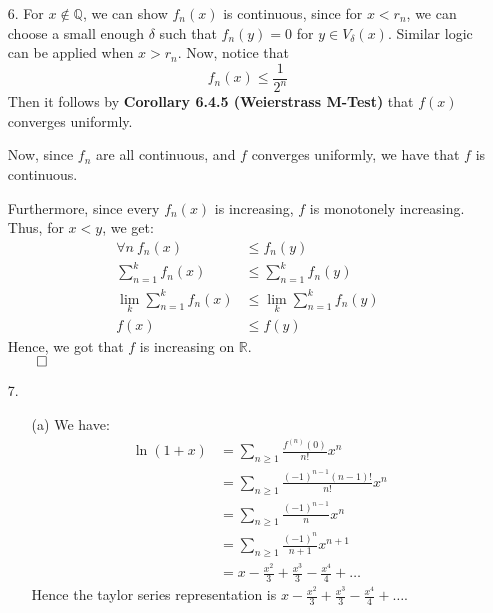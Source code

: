 \documentclass[11pt]{article}
\newcommand{\reals}{\mathbb{R}}
\begin{document}
\begin{itemize}
    \item[6.]
        For $x \not\in \mathbb{Q}$, we can show $f_n(x)$ is continuous, since
        for $x < r_n$, we can choose a small enough $\delta$ such that $f_n(y)
        = 0$ for $y \in V_\delta(x)$. Similar logic can be applied when $x >
        r_n$. Now, notice that
        \begin{equation*}
            f_n(x) \leq \frac{1}{2^n}
        \end{equation*}
        Then it follows by \textbf{Corollary 6.4.5 (Weierstrass M-Test)} that
        $f(x)$ converges uniformly.

        Now, since $f_n$ are all continuous, and $f$ converges uniformly, we
        have that $f$ is continuous.

        Furthermore, since every $f_n(x)$ is increasing, $f$ is monotonely
        increasing. Thus, for $x < y$, we get:
        \begin{align*}
          \forall n\ f_n(x) &\leq f_n(y)\\
          \sum_{n = 1}^k f_n(x) &\leq \sum_{n = 1}^k f_n(y)\\
          \lim_k \sum_{n = 1}^k f_n(x) &\leq \lim_k \sum_{n = 1}^k f_n(y)\\
          f(x) &\leq f(y)
        \end{align*}
        Hence, we got that $f$ is increasing on $\reals$.\\
        $\qed$

    \item[7.]
        \begin{itemize}
            \item[(a)]
                We have:
                \begin{align*}
                    \ln (1 + x) &= \sum_{n \geq 1} \frac{f^{(n)} (0)}{n!} x^n\\
                                &= \sum_{n \geq 1}
                                    \frac{(-1)^{n - 1}(n - 1)!}{n!} x^n\\
                                &= \sum_{n \geq 1} \frac{(-1)^{n - 1}}{n} x^n\\
                                &= \sum_{n \geq 1} \frac{(-1)^{n}}{n + 1}
                                   x^{n + 1}\\
                                &= x - \frac{x^2}{3} + \frac{x^3}{3} -
                                       \frac{x^4}{4} + \dots
                \end{align*}
                Hence the taylor series representation is $x - \frac{x^2}{3} +
                \frac{x^3}{3} - \frac{x^4}{4} + \dots$.


\end{itemize}
\end{itemize}
\end{document}

